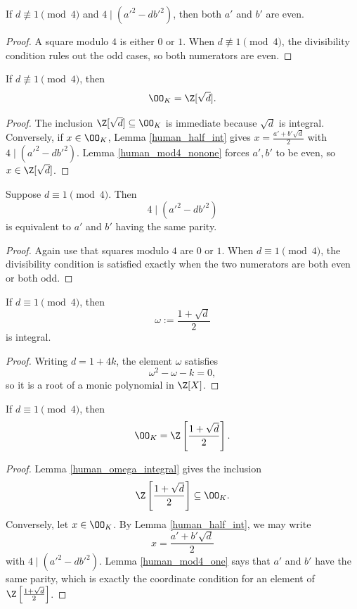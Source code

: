 \begin{human_lemma}\label{human_mod4_nonone}
  If $d \not\equiv 1 \pmod 4$ and
  $4 \mid (a'^2 - d b'^2)$, then both $a'$ and $b'$ are even.
\end{human_lemma}
\begin{proof}
  A square modulo $4$ is either $0$ or $1$.
  When $d \not\equiv 1 \pmod 4$, the divisibility condition rules out the odd
  cases, so both numerators are even.
\end{proof}

\begin{human_theorem}\label{human_nonone_branch}
  If $d \not\equiv 1 \pmod 4$, then
  \[
  \OO_K = \Z[\sqrt{d}].
  \]
\end{human_theorem}
\begin{proof}
  The inclusion $\Z[\sqrt{d}] \subseteq \OO_K$ is immediate because
  $\sqrt{d}$ is integral.
  Conversely, if $x \in \OO_K$, Lemma \ref{human_half_int} gives
  $x = \frac{a' + b'\sqrt{d}}{2}$ with
  $4 \mid (a'^2 - d b'^2)$.
  Lemma \ref{human_mod4_nonone} forces $a', b'$ to be even, so $x \in \Z[\sqrt{d}]$.
\end{proof}

\begin{human_lemma}\label{human_mod4_one}
  Suppose $d \equiv 1 \pmod 4$.
  Then
  \[
  4 \mid (a'^2 - d b'^2)
  \]
  is equivalent to $a'$ and $b'$ having the same parity.
\end{human_lemma}
\begin{proof}
  Again use that squares modulo $4$ are $0$ or $1$.
  When $d \equiv 1 \pmod 4$, the divisibility condition is satisfied exactly
  when the two numerators are both even or both odd.
\end{proof}

\begin{human_lemma}\label{human_omega_integral}
  If $d \equiv 1 \pmod 4$, then
  \[
  \omega := \frac{1 + \sqrt{d}}{2}
  \]
  is integral.
\end{human_lemma}
\begin{proof}
  Writing $d = 1 + 4k$, the element $\omega$ satisfies
  \[
  \omega^2 - \omega - k = 0,
  \]
  so it is a root of a monic polynomial in $\Z[X]$.
\end{proof}

\begin{human_theorem}\label{human_one_branch}
  If $d \equiv 1 \pmod 4$, then
  \[
  \OO_K = \Z\left[\frac{1+\sqrt{d}}{2}\right].
  \]
\end{human_theorem}
\begin{proof}
  Lemma \ref{human_omega_integral} gives the inclusion
  \[
  \Z\left[\frac{1+\sqrt{d}}{2}\right] \subseteq \OO_K.
  \]
  Conversely, let $x \in \OO_K$.
  By Lemma \ref{human_half_int}, we may write
  \[
  x = \frac{a' + b'\sqrt{d}}{2}
  \]
  with $4 \mid (a'^2 - d b'^2)$.
  Lemma \ref{human_mod4_one} says that $a'$ and $b'$ have the same parity,
  which is exactly the coordinate condition for an element of
  $\Z\left[\frac{1+\sqrt{d}}{2}\right]$.
\end{proof}
